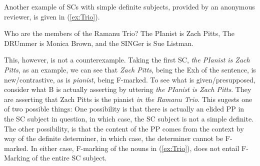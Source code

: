 \documentclass[
]{RCL}
\begin{document}
Another example of SCs with simple definite subjects, provided by an anonymous reviewer, is given in (\ref{ex:Trio}).
\begin{exe}
	\ex\label{ex:Trio}
\begin{xlist}
	 Who are the members of the Ramanu Trio?
	 The PIanist is Zach Pitts, The DRUmmer is Monica Brown, and the SINGer is Sue Listman.
\end{xlist}	
\end{exe}

This, however, is not a counterexample.
Taking the first SC, \textit{the PIanist is Zach Pitts}, as an example, we can see that \textit{Zach Pitts}, being the Exh of the sentence, is new/contrastive, as is \textit{pianist}, being F-marked.
To see what is given/presupposed, consider what B is actually asserting by uttering \textit{the PIanist is Zach Pitts}.
They are asserting that Zach Pitts is the pianist \textit{in the Ramanu Trio}.
This sugests one of two possible things:
One possibility is that there is actually an elided PP in the SC subject in question, in which case, the SC subject is not a simple definite.
The other possibility, is that the content of the PP comes from the context by way of the definite determiner, in which case, the determiner cannot be F-marked.
In either case, F-marking of the nouns in (\ref{ex:Trio}), does not entail F-Marking of the entire SC subject.
\end{document}
